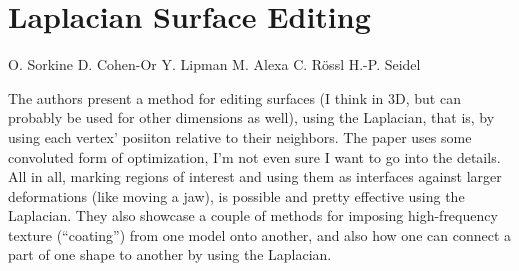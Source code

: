 \section*{Laplacian Surface Editing}

O. Sorkine
D. Cohen-Or
Y. Lipman
M. Alexa
C. Rössl
H.-P. Seidel

The authors present a method for editing surfaces (I think in 3D, but can probably be used for other dimensions as well), using the Laplacian, that is, by using each vertex' posiiton relative to their neighbors. The paper uses some convoluted form of optimization, I'm not even sure I want to go into the details. All in all, marking regions of interest and using them as interfaces against larger deformations (like moving a jaw), is possible and pretty effective using the Laplacian. They also showcase a couple of methods for imposing high-frequency texture (``coating'') from one model onto another, and also how one can connect a part of one shape to another by using the Laplacian.


